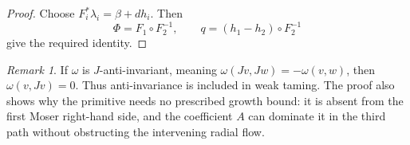\documentclass[11pt,a4paper]{article}
\theoremstyle{remark}
\newtheorem{remark}[theorem]{Remark}
\numberwithin{equation}{section}
\begin{document}
\begin{proof}
Choose $F_i^*\lambda_i=\beta+dh_i$. Then
\[
\Phi=F_1\circ F_2^{-1},\qquad
q=(h_1-h_2)\circ F_2^{-1}
\]
give the required identity.
\end{proof}

\begin{remark}
If $\omega$ is $J$-anti-invariant, meaning $\omega(Jv,Jw)=-\omega(v,w)$, then $\omega(v,Jv)=0$. Thus anti-invariance is included in weak taming. The proof also shows why the primitive needs no prescribed growth bound: it is absent from the first Moser right-hand side, and the coefficient $A$ can dominate it in the third path without obstructing the intervening radial flow.
\end{remark}
\end{document}
